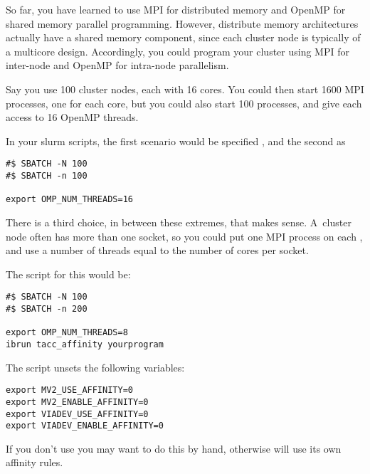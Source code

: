 
So far, you have learned to use MPI for distributed memory and OpenMP
for shared memory parallel programming. However, distribute memory
architectures actually have a shared memory component, since each
cluster node is typically of a multicore design. Accordingly, you
could program your cluster using MPI for inter-node and OpenMP for
intra-node parallelism.

Say you use 100 cluster nodes, each with 16 cores. You could then
start 1600 MPI processes, one for each core, but you could also start
100 processes, and give each access to 16 OpenMP threads.

\begin{tacc}
In your slurm scripts, the first scenario would be specified , and the second as
\begin{verbatim}
#$ SBATCH -N 100
#$ SBATCH -n 100

export OMP_NUM_THREADS=16
\end{verbatim}
\end{tacc}

There is a third choice, in between these extremes, that makes
sense. A~cluster node often has more than one socket, so you could put
one MPI process on each , and use a number of
threads equal to the number of cores per socket.

\begin{tacc}
The script for this would be:
\begin{verbatim}
#$ SBATCH -N 100
#$ SBATCH -n 200

export OMP_NUM_THREADS=8
ibrun tacc_affinity yourprogram
\end{verbatim}

The  script unsets the following variables:
\begin{verbatim}
export MV2_USE_AFFINITY=0
export MV2_ENABLE_AFFINITY=0
export VIADEV_USE_AFFINITY=0
export VIADEV_ENABLE_AFFINITY=0
\end{verbatim}
If you don't use  you may want to do this by hand,
otherwise  will use its own affinity rules.
\end{tacc}

